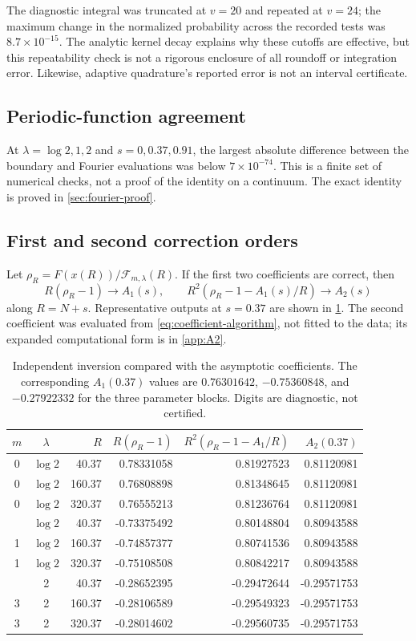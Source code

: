 \documentclass[11pt,a4paper]{article}
\numberwithin{equation}{section}
\theoremstyle{definition}
\newcommand{\calF}{\mathcal F}
\begin{document}
The diagnostic integral was truncated at $v=20$ and repeated at $v=24$; the maximum change in the normalized probability across the recorded tests was $8.7\times10^{-15}$. The analytic kernel decay explains why these cutoffs are effective, but this repeatability check is not a rigorous enclosure of all roundoff or integration error. Likewise, adaptive quadrature's reported error is not an interval certificate.

\subsection{Periodic-function agreement}
At $\lambda=\log2,1,2$ and $s=0,0.37,0.91$, the largest absolute difference between the boundary and Fourier evaluations was below $7\times10^{-74}$. This is a finite set of numerical checks, not a proof of the identity on a continuum. The exact identity is proved in \cref{sec:fourier-proof}.

\subsection{First and second correction orders}
Let $\rho_R=F(x(R))/\calF_{m,\lambda}(R)$. If the first two coefficients are correct, then
\[
 R(\rho_R-1)\to A_1(s),\qquad
 R^2(\rho_R-1-A_1(s)/R)\to A_2(s)
\]
along $R=N+s$. Representative outputs at $s=0.37$ are shown in \cref{tab:checks}. The second coefficient was evaluated from \eqref{eq:coefficient-algorithm}, not fitted to the data; its expanded computational form is in \cref{app:A2}.

\begin{table}[htbp]
\centering\small
\begin{tabular}{@{}ccrrrr@{}}
\toprule
$m$&$\lambda$&$R$&$R(\rho_R-1)$&$R^2(\rho_R-1-A_1/R)$&$A_2(0.37)$\\
\midrule
0&$\log2$&40.37& 0.78331058&0.81927523&0.81120981\\
0&$\log2$&160.37&0.76808898&0.81348645&0.81120981\\
0&$\log2$&320.37&0.76555213&0.81236764&0.81120981\\
\addlinespace
1&$\log2$&40.37&-0.73375492&0.80148804&0.80943588\\
1&$\log2$&160.37&-0.74857377&0.80741536&0.80943588\\
1&$\log2$&320.37&-0.75108508&0.80842217&0.80943588\\
\addlinespace
3&2&40.37&-0.28652395&-0.29472644&-0.29571753\\
3&2&160.37&-0.28106589&-0.29549323&-0.29571753\\
3&2&320.37&-0.28014602&-0.29560735&-0.29571753\\
\bottomrule
\end{tabular}
\caption{Independent inversion compared with the asymptotic coefficients. The corresponding $A_1(0.37)$ values are $0.76301642$, $-0.75360848$, and $-0.27922332$ for the three parameter blocks. Digits are diagnostic, not certified.}
\label{tab:checks}
\end{table}
\end{document}
